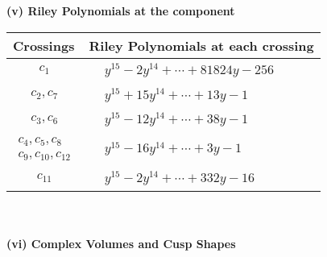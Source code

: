 \documentclass[1p]{elsarticle_modified}
\theoremstyle{definition}
\begin{document}
\newpage\renewcommand{\arraystretch}{1}
\flushleft \textbf{(v) Riley Polynomials at the component}\newline \\
\begin{tabular}{m{50pt}|m{274pt}}
Crossings & \hspace{64pt}Riley Polynomials at each crossing \\
\hline $$\begin{aligned}c_{1}\end{aligned}$$&$\begin{aligned}
&y^{15}-2 y^{14}+\cdots+81824 y-256
\end{aligned}$\\
\hline $$\begin{aligned}c_{2},c_{7}\end{aligned}$$&$\begin{aligned}
&y^{15}+15 y^{14}+\cdots+13 y-1
\end{aligned}$\\
\hline $$\begin{aligned}c_{3},c_{6}\end{aligned}$$&$\begin{aligned}
&y^{15}-12 y^{14}+\cdots+38 y-1
\end{aligned}$\\
\hline $$\begin{aligned}c_{4},c_{5},c_{8}\\c_{9},c_{10},c_{12}\end{aligned}$$&$\begin{aligned}
&y^{15}-16 y^{14}+\cdots+3 y-1
\end{aligned}$\\
\hline $$\begin{aligned}c_{11}\end{aligned}$$&$\begin{aligned}
&y^{15}-2 y^{14}+\cdots+332 y-16
\end{aligned}$\\
\hline
\end{tabular}\\~\\
\newpage\flushleft \textbf{(vi) Complex Volumes and Cusp Shapes}
\end{document}
